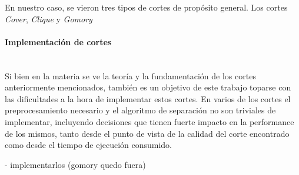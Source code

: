 En nuestro caso, se vieron tres tipos de cortes de prop\'osito general. Los cortes \emph{Cover}, \emph{Clique} y \emph{Gomory}



\paragraph{Implementaci\'on de cortes} \\

Si bien en la materia se ve la teor\'ia y la fundamentaci\'on de los cortes anteriormente mencionados, tambi\'en es un objetivo de este trabajo toparse con las dificultades a la hora de implementar estos cortes. En varios de los cortes el preprocesamiento necesario y el algoritmo de separaci\'on no son triviales de implementar, incluyendo decisiones que tienen fuerte impacto en la performance de los mismos, tanto desde el punto de vista de la calidad del corte encontrado como desde el tiempo de ejecuci\'on consumido.


- implementarlos (gomory quedo fuera)

